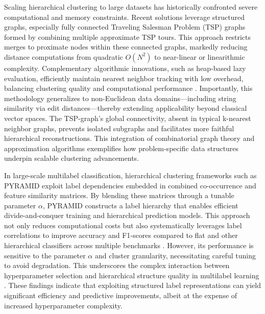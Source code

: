 \documentclass[11pt]{article}
\begin{document}
Scaling hierarchical clustering to large datasets has historically confronted severe computational and memory constraints. Recent solutions leverage structured graphs, especially fully connected Traveling Salesman Problem (TSP) graphs formed by combining multiple approximate TSP tours. This approach restricts merges to proximate nodes within these connected graphs, markedly reducing distance computations from quadratic \(O(N^2)\) to near-linear or linearithmic complexity. Complementary algorithmic innovations, such as heap-based lazy evaluation, efficiently maintain nearest neighbor tracking with low overhead, balancing clustering quality and computational performance \cite{ref21}. Importantly, this methodology generalizes to non-Euclidean data domains—including string similarity via edit distances—thereby extending applicability beyond classical vector spaces. The TSP-graph’s global connectivity, absent in typical k-nearest neighbor graphs, prevents isolated subgraphs and facilitates more faithful hierarchical reconstructions. This integration of combinatorial graph theory and approximation algorithms exemplifies how problem-specific data structures underpin scalable clustering advancements.

In large-scale multilabel classification, hierarchical clustering frameworks such as PYRAMID exploit label dependencies embedded in combined co-occurrence and feature similarity matrices. By blending these matrices through a tunable parameter \(\alpha\), PYRAMID constructs a label hierarchy that enables efficient divide-and-conquer training and hierarchical prediction models. This approach not only reduces computational costs but also systematically leverages label correlations to improve accuracy and F1-scores compared to flat and other hierarchical classifiers across multiple benchmarks \cite{ref17}. However, its performance is sensitive to the parameter \(\alpha\) and cluster granularity, necessitating careful tuning to avoid degradation. This underscores the complex interaction between hyperparameter selection and hierarchical structure quality in multilabel learning \cite{ref17}. These findings indicate that exploiting structured label representations can yield significant efficiency and predictive improvements, albeit at the expense of increased hyperparameter complexity.
\end{document}
